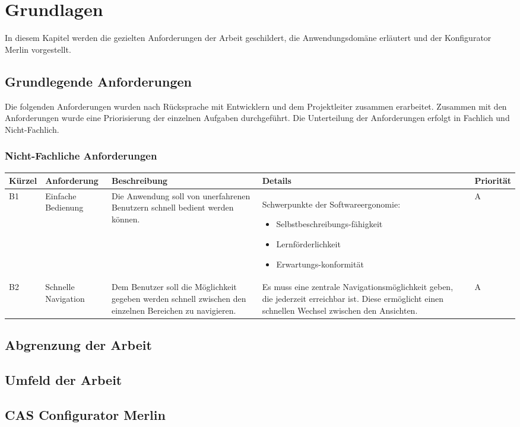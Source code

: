 

\chapter{Grundlagen} \label{chapter_2}

In diesem Kapitel werden die gezielten Anforderungen der Arbeit geschildert, die Anwendungsdomäne erläutert und der Konfigurator Merlin vorgestellt. 

\section{Grundlegende Anforderungen}
Die folgenden Anforderungen wurden nach Rücksprache mit Entwicklern und dem Projektleiter zusammen erarbeitet. Zusammen mit den Anforderungen wurde eine Priorisierung der einzelnen Aufgaben durchgeführt. Die Unterteilung der Anforderungen erfolgt in Fachlich und Nicht-Fachlich.

\subsection{Nicht-Fachliche Anforderungen}
\begin{tabular}{| p{1.1cm} | p{2.2cm} | p{4.3cm} | p{4.9cm} | p{1.3cm} |}
\toprule[2pt] \rowcolor{dunkelgrau}
\hline
  Kürzel & Anforderung & Beschreibung & Details & Priorität \\
  \hline
  B1 & Einfache \newline Bedienung & Die Anwendung soll von unerfahrenen Benutzern schnell bedient werden können.& Schwerpunkte der Softwareergonomie\cite{bib:softwareErgonomie}: 
  \begin{itemize}
        \item Selbstbeschreibungs-fähigkeit
        \item Lernförderlichkeit
        \item Erwartungs-konformität
     \end{itemize}
   & A \\
  \hline
  B2 & Schnelle Navigation & Dem Benutzer soll die Möglichkeit gegeben werden schnell zwischen den einzelnen Bereichen zu navigieren. & Es muss eine zentrale Navigationsmöglichkeit geben, die jederzeit erreichbar ist. Diese ermöglicht einen schnellen Wechsel zwischen den Ansichten. & A \\
    \hline
\bottomrule[2pt]
 \end{tabular}

\section{Abgrenzung der Arbeit}

\section{Umfeld der Arbeit}

\section{CAS Configurator Merlin}
